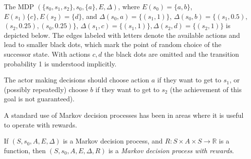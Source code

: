 \begin{example}
    \label{ex_mdp}
    The MDP $(\{s_0, s_1, s_2\}, s_0, \{a\}, E, \Delta)$,
    where
    $E(s_0) = \{a,b\}$, $E(s_1) \{c\}, E(s_2) = \{d\}$,
    and $\Delta(s_0, a) = \{(s_1, 1)\}$,
    $\Delta(s_0, b) = \{(s_1, 0.5),$ $(s_2,0.25), (s_0,0.25)\}$,
    $\Delta(s_1,c) = \{(s_1,1)\},
    \Delta(s_2,d) = \{(s_2,1)\}$
    is depicted below.
    The edges labeled with letters denote the available actions
    and lead to smaller black dots, which mark the point of random
    choice of the successor state. With actions $c,d$ the black dots are
    omitted and the transition probability 1 is understood implicitly.

    The actor making decisions should choose action $a$ if
    they want to get to $s_1$, or (possibly repeatedly) choose $b$ if
    they want to get to $s_2$ (the achievement of this goal is not
    guaranteed).

\hfill \break
\centering
{}

\end{example}

A standard use of Markov decision processes has been in areas where it
is useful to operate with rewards.

\begin{definition}
If $(S, s_0, A, E, \Delta)$ is a Markov decision process,
and \linebreak $R : S \times A \times S \to \mathbb{R}$ is a function,
then $(S, s_0, A,E,\Delta,R)$ is a {\em Markov decision process with rewards}.
\end{definition}


